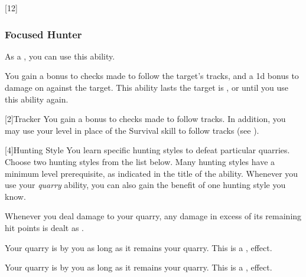             [12]{} 

        \subsubsection{Focused Hunter}

            As a , you can use this ability.
            \begin{ability}
                \begin{spelltargetinginfo}
                \end{spelltargetinginfo}
                \begin{spelleffects}
                    \spelleffect You gain a  bonus to checks made to follow the target's tracks, and a \plus1d bonus to damage on  against the target.
                    This ability lasts the target is , or until you use this ability again.
                \end{spelleffects}
            \end{ability}

            [2]{Tracker}
            You gain a  bonus to checks made to follow tracks.
            In addition, you may use your level in place of the Survival skill to follow tracks (see ).

            [4]{Hunting Style}
            You learn specific hunting styles to defeat particular quarries.
            Choose two hunting styles from the list below.
            Many hunting styles have a minimum level prerequisite, as indicated in the title of the ability.
            Whenever you use your \textit{quarry} ability, you can also gain the benefit of one hunting style you know.

            Whenever you deal damage to your quarry, any damage in excess of its remaining hit points is dealt as .

            Your quarry is \shaken by you as long as it remains your quarry.
            This is a ,  effect.

            Your quarry is \goaded by you as long as it remains your quarry.
            This is a ,  effect.

